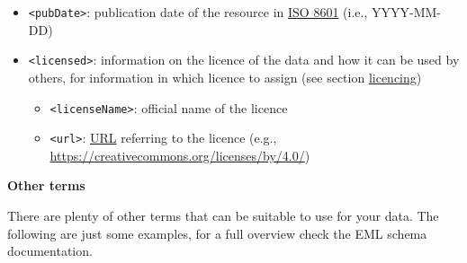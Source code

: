 \documentclass[
]{book}
\providecommand{\tightlist}{%
  \setlength{\itemsep}{0pt}\setlength{\parskip}{0pt}}
\begin{document}
\begin{itemize}
  \begin{itemize}
  \tightlist
  \item
    \texttt{\textless{}methodStep\textgreater{}}: can be repeated for each method step and includes a range of subterms to specify instruments, software, protocols, descriptions, and citations of the methods
  \end{itemize}
\item
  {\texttt{\textless{}pubDate\textgreater{}}}: publication date of the resource in \href{https://www.iso.org/iso-8601-date-and-time-format.html}{ISO 8601} (i.e., YYYY-MM-DD)
\item
  {\texttt{\textless{}licensed\textgreater{}}}: information on the licence of the data and how it can be used by others, for information in which licence to assign (see section \protect\hyperlink{Licencing}{licencing})

  \begin{itemize}
  \tightlist
  \item
    \texttt{\textless{}licenseName\textgreater{}}: official name of the licence
  \item
    \texttt{\textless{}url\textgreater{}}: \protect\hyperlink{URI}{URL} referring to the licence (e.g., \url{https://creativecommons.org/licenses/by/4.0/})
  \end{itemize}
\end{itemize}

{\textbf{Other terms}}

There are plenty of other terms that can be suitable to use for your data. The following are just some examples, for a full overview check the EML schema documentation.
\end{document}
